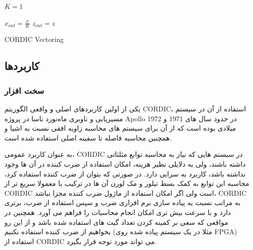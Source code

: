 \documentclass[12pt,titlepage,a4page , tikz , multi,table , svgnames,xcdraw]{article}
\begin{document}
\begin{latin}
\begin{algorithm}[H]
\DontPrintSemicolon
{}

\SetAlgoLined
{}

  $K = 1$\;
  
  $x_{out} = \frac{x}{K}$\;
  $z_{out} = z$\;
 
 \caption{CORDIC Vectoring}
\end{algorithm}
\end{latin}

\newpage

\subsection{کاربردها}

\subsubsection{سخت افزار}

یکی از اولین کاربردهای اصلی و واقعی الگوریتم CORDIC، استفاده از آن در سیستم مسیریابی و ناوبری ماه‌نورد ناسا در پروژه Apollo در حدود سال های 1971 و 1972 میلادی بوده است که از آن برای سیستم های محاسبه زاویه افقی نسبت به اشیا و همچنین محاسبه فاصله تا سفینه اصلی استفاده شده است. \cite{lunar}

به عنوان کاربرد عمومی، CORDIC در سیستم هایی که نیاز به محاسبه توابع مثلثاتی داشته باشند، ولی به دلایلی نظیر هزینه، امکان استفاده از ضرب کننده در آن ها وجود نداشته باشد، کاربرد به سزایی دارد. در صورتی که بتوان از ضرب کننده استفاده کرد، محاسبه این توابع به کمک بسط تیلور و مک لورن آن ها در ترکیب با  معمولا سریع تر از CORDIC است ولی اگر امکان استفاده از ماژول ضرب کننده مجزا نباشد، CORDIC به مراتب نسبت به پیاده سازی نرم افزاری ضرب و سپس استفاده از ضرب، برتری دارد و با سرعت بیش تری امکان انجام محاسبات را فراهم می آورد. همچنین در مواقعی که سعی بر کمینه کردن تعداد گیت های استفاده شده باشد و از این رو بخواهیم از ضرب کننده استفاده نکنیم (مثلا در یک سیستم پیاده شده روی FPGA) استفاده از CORDIC می تواند مورد توجه قرار بگیرد.
\end{document}
